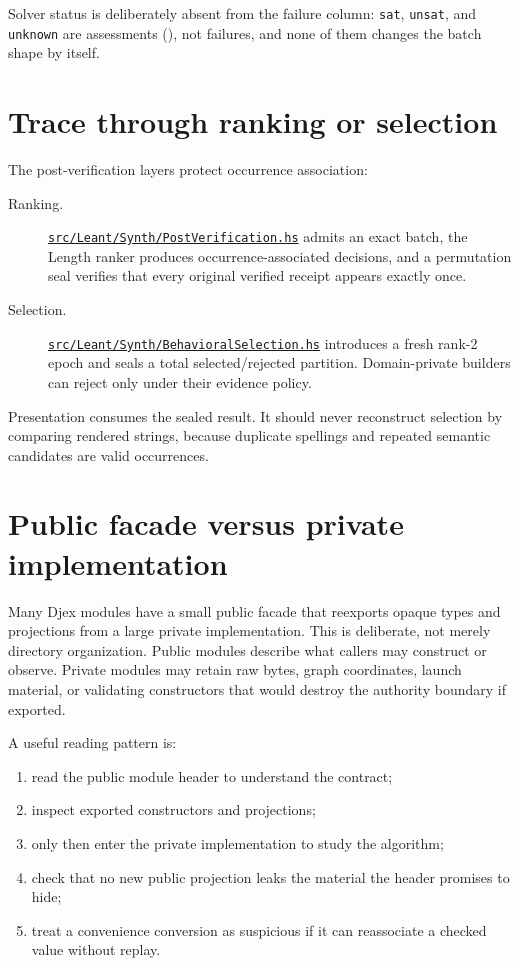\documentclass[10pt,letterpaper,oneside]{report}
\newcommand{\code}[1]{\texttt{\detokenize{#1}}}
\newcommand{\sat}{\texttt{sat}}
\newcommand{\unsat}{\texttt{unsat}}
\newcommand{\unknown}{\texttt{unknown}}
\def\LeantCommit{494259dbd85ae2e6749246b08377f44b2f9936ac}
\def\LeantBase{https://github.com/VladimirReshetnikov/Leant/blob/\LeantCommit/}
\newcommand{\lpath}[1]{\href{\LeantBase#1}{\nolinkurl{#1}}}
\begin{document}
Solver status is deliberately absent from the failure column: \sat, \unsat, and \unknown{} are assessments (\code{Heuristic}), not failures, and none of them changes the batch shape by itself.


\section{Trace through ranking or selection}

The post-verification layers protect occurrence association:

\begin{description}
\item[Ranking.] \lpath{src/Leant/Synth/PostVerification.hs} admits an exact batch, the Length ranker produces occurrence-associated decisions, and a permutation seal verifies that every original verified receipt appears exactly once.

\item[Selection.] \lpath{src/Leant/Synth/BehavioralSelection.hs} introduces a fresh rank-2 epoch and seals a total selected/rejected partition. Domain-private builders can reject only under their evidence policy.
\end{description}

Presentation consumes the sealed result. It should never reconstruct selection by comparing rendered strings, because duplicate spellings and repeated semantic candidates are valid occurrences.

\section{Public facade versus private implementation}

Many Djex modules have a small public facade that reexports opaque types and projections from a large private implementation. This is deliberate, not merely directory organization. Public modules describe what callers may construct or observe. Private modules may retain raw bytes, graph coordinates, launch material, or validating constructors that would destroy the authority boundary if exported.

A useful reading pattern is:

\begin{enumerate}
\item read the public module header to understand the contract;
\item inspect exported constructors and projections;
\item only then enter the private implementation to study the algorithm;
\item check that no new public projection leaks the material the header promises to hide;
\item treat a convenience conversion as suspicious if it can reassociate a checked value without replay.
\end{enumerate}
\end{document}
